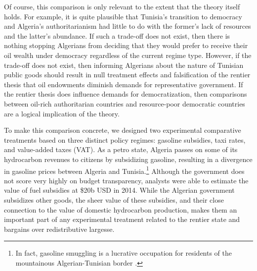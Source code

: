 \documentclass[12pt, letterpaper]{article}
\begin{document}
Of course, this comparison is only relevant to the extent that the theory itself holds. For example, it is quite plausible that Tunisia's transition to democracy and Algeria's authoritarianism had little to do with the former's lack of resources and the latter's abundance. If such a trade-off does not exist, then there is nothing stopping Algerians from deciding that they would prefer to receive their oil wealth under democracy regardless of the current regime type. However, if the trade-off does not exist, then informing Algerians about the nature of Tunisian public goods should result in null treatment effects and falsification of the rentier thesis that oil endowments diminish demands for representative government. If the rentier thesis does influence demands for democratization, then comparisons between oil-rich authoritarian countries and resource-poor democratic countries are a logical implication of the theory. 



To make this comparison concrete, we designed two experimental comparative treatments based on three distinct policy regimes: gasoline subsidies, taxi rates, and value-added taxes (VAT). As a petro state, Algeria passes on some of its hydrocarbon revenues to citizens by subsidizing gasoline, resulting in a divergence in gasoline prices between Algeria and Tunisia.\footnote{In fact, gasoline smuggling is a lucrative occupation for residents of the mountainous Algerian-Tunisian border \parencite{ghanem_algerias_2020}.} Although the government does not score very highly on budget transparency, analysts were able to estimate the value of fuel subsidies at \$20b USD in 2014. While the Algerian government subsidizes other goods, the sheer value of these subsidies, and their close connection to the value of domestic hydrocarbon production, makes them an important part of any experimental treatment related to the rentier state and bargains over redistributive largesse.
\end{document}
